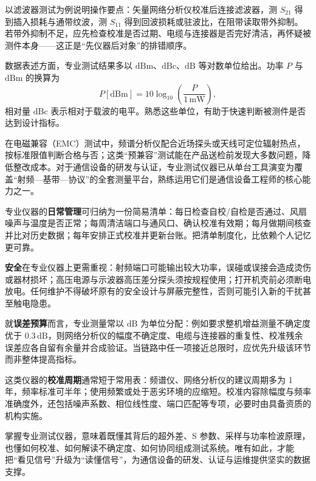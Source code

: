 以滤波器测试为例说明操作要点：矢量网络分析仪校准后连接滤波器，测 $S_{21}$ 得到插入损耗与通带纹波，测 $S_{11}$ 得到回波损耗或驻波比，在阻带读取带外抑制。若带外抑制不足，应先检查校准是否过期、电缆与连接器是否完好清洁，再怀疑被测件本身——这正是“先仪器后对象”的排错顺序。

数据表述方面，专业测试结果多以 $\mathrm{dBm}$、$\mathrm{dBc}$、$\mathrm{dB}$ 等对数单位给出。功率 $P$ 与 $\mathrm{dBm}$ 的换算为
\[
    P[\mathrm{dBm}] = 10\log_{10}\!\left(\frac{P}{1\,\mathrm{mW}}\right),
\]
相对量 $\mathrm{dBc}$ 表示相对于载波的电平。熟悉这些单位，有助于快速判断被测件是否达到设计指标。

在电磁兼容（EMC）测试中，频谱分析仪配合近场探头或天线可定位辐射热点，按标准限值判断合格与否；这类“预兼容”测试能在产品送检前发现大多数问题，降低整改成本。对于通信设备的研发与认证，专业测试仪器已从单台工具演变为覆盖“射频—基带—协议”的全套测量平台，熟练运用它们是通信设备工程师的核心能力之一。

专业仪器的\textbf{日常管理}可归纳为一份简易清单：每日检查自校/自检是否通过、风扇噪声与温度是否正常；每周清洁端口与通风口、确认校准有效期；每月做期间核查并比对历史数据；每年安排正式校准并更新台账。把清单制度化，比依赖个人记忆更可靠。

\textbf{安全}在专业仪器上更需重视：射频端口可能输出较大功率，误碰或误接会造成烫伤或器材损坏；高压电源与示波器高压差分探头须按规程使用；打开机壳前必须断电放电。任何维护不得破坏原有的安全设计与屏蔽完整性，否则可能引入新的干扰甚至触电隐患。

就\textbf{误差预算}而言，专业测量常以 $\mathrm{dB}$ 为单位分配：例如要求整机增益测量不确定度优于 $0.3\,\mathrm{dB}$，则网络分析仪的幅度不确定度、电缆与连接器的重复性、校准残余误差应各自留有余量并合成验证。当链路中任一项接近总限时，应优先升级该环节而非整体提高指标。

这类仪器的\textbf{校准周期}通常短于常用表：频谱仪、网络分析仪的建议周期多为 1 年，频率标准可半年；使用频繁或处于恶劣环境的应缩短。校准内容除幅度与频率准确度外，还包括噪声系数、相位线性度、端口匹配等专项，必要时由具备资质的机构实施。

掌握专业测试仪器，意味着既懂其背后的超外差、S 参数、采样与功率检波原理，也懂如何校准、如何解读不确定度、如何协同组成测试系统。唯有如此，才能把“看见信号”升级为“读懂信号”，为通信设备的研发、认证与运维提供坚实的数据支撑。
